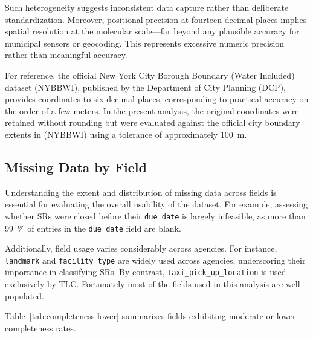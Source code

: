 \documentclass[linenumber]{jdsart}
\begin{document}
Such heterogeneity suggests inconsistent data capture rather than deliberate
standardization. Moreover, positional precision at fourteen decimal places
implies spatial resolution at the molecular scale—far beyond any plausible
accuracy for municipal sensors or geocoding. This represents excessive numeric
precision rather than meaningful accuracy.

For reference, the official New York City Borough Boundary (Water Included)
dataset (\textsc{NYBBWI}), published by the Department of City Planning (DCP),
provides coordinates to six decimal places, corresponding to practical
accuracy on the order of a few meters. In the present analysis, the original
coordinates were retained without rounding but were evaluated against the
official city boundary extents in (\textsc{NYBBWI}) using a tolerance of
approximately \SI[round-precision=0]{100}{\meter}.


\subsection{Missing Data by Field}
\label{subsec:blanks}
Understanding the extent and distribution of missing data across fields is
essential for evaluating the overall usability of the dataset. For example,
assessing whether SRs were closed before their \texttt{due\_date} is largely
infeasible, as more than \SI[round-precision=0]{99}{\percent} of entries in the
\texttt{due\_date} field are blank.

Additionally, field usage varies considerably across agencies. For instance,
\texttt{landmark} and \texttt{facility\_type} are widely used across agencies,
underscoring their importance in classifying SRs. By contrast,
\texttt{taxi\_pick\_up\_location} is used exclusively by TLC. Fortunately most
of the fields used in this analysis are well populated.

Table~\ref{tab:completeness-lower} summarizes fields exhibiting moderate or
lower completeness rates.
\end{document}
